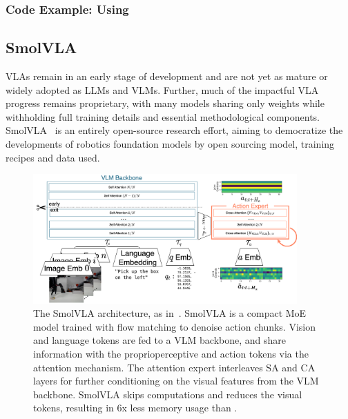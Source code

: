 \subsubsection{Code Example: Using \pizero}

\subsection{SmolVLA}
VLAs remain in an early stage of development and are not yet as mature or widely adopted as LLMs and VLMs.
Further, much of the impactful VLA progress remains proprietary, with many models sharing only weights while withholding full training details and essential methodological components.
SmolVLA~\citep{shukorSmolVLAVisionLanguageActionModel2025} is an entirely open-source research effort, aiming to democratize the developments of robotics foundation models by open sourcing model, training recipes and data used.

\begin{figure}
    \centering
    \includegraphics[width=0.9\textwidth]{figures/ch5/ch5-smolvla.png}
    \caption{The SmolVLA architecture, as in~\citet{shukorSmolVLAVisionLanguageActionModel2025}. SmolVLA is a compact MoE model trained with flow matching to denoise action chunks. Vision and language tokens are fed to a VLM backbone, and share information with the proprioperceptive and action tokens via the attention mechanism. The attention expert interleaves SA and CA layers for further conditioning on the visual features from the VLM backbone. SmolVLA skips computations and reduces the visual tokens, resulting in 6x less memory usage than \pizero.}
    \label{fig:ch5-smolvla}
\end{figure}

